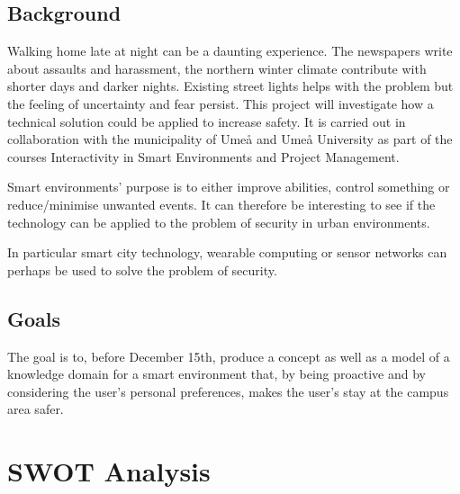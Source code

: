 \documentclass[twoside]{report}
\begin{document}
\subsection{Background}

Walking home late at night can be a daunting experience. The newspapers write
about assaults and harassment, the northern winter climate contribute with
shorter days and darker nights. Existing street lights helps with the problem
but the feeling of uncertainty and fear persist. This project will investigate
how a technical solution could be applied to increase safety. It is carried out
in collaboration with the municipality of Umeå and Umeå University as part of
the courses Interactivity in Smart Environments and Project Management.

Smart environments’ purpose is to either improve abilities, control something
or reduce/minimise unwanted events. It can therefore be interesting to see if
the technology can be applied to the problem of security in urban environments. 

In particular smart city technology, wearable computing or sensor networks can
perhaps be used to solve the problem of security. 

\subsection{Goals} The goal is to, before December 15th, produce a concept as
well as a model of a knowledge domain for a smart environment that, by being
proactive and by considering the user's personal preferences, makes the user’s
stay at the campus area safer.
\newpage

\section{SWOT Analysis}
\end{document}

